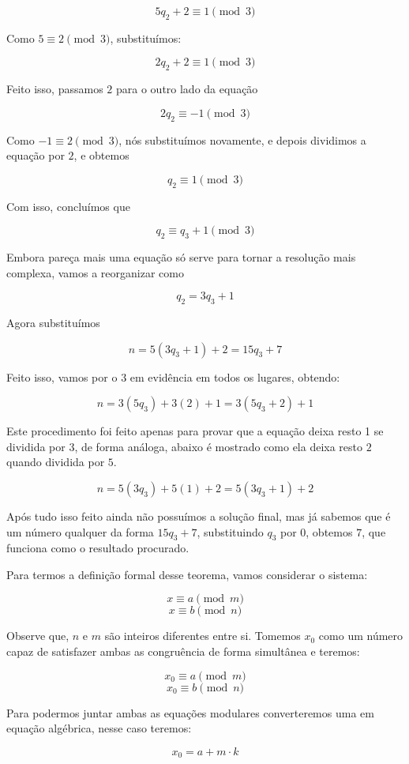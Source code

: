 $$5q_2 + 2 \equiv 1 \pmod{3}$$

Como $5 \equiv 2\pmod{3}$, substitu\'imos:

$$ 2q_2 + 2 \equiv 1 \pmod{3}$$

Feito isso, passamos $2$ para o outro lado da equa\c{c}\~ao

$$ 2q_2  \equiv -1 \pmod{3}$$

Como $-1 \equiv 2 \pmod{3}$, n\'os substitu\'imos novamente, e depois dividimos a equa\c{c}\~ao por $2$, e obtemos

$$ q_2  \equiv 1 \pmod{3}$$

Com isso, conclu\'imos que

$$ q_2  \equiv q_3 + 1 \pmod{3}$$

Embora pare\c{c}a mais uma equa\c{c}\~ao s\'o serve para tornar a resolu\c{c}\~ao mais complexa, vamos a reorganizar como

$$ q_2 = 3q_3 + 1 $$

Agora substitu\'imos

$$n = 5(3q_3 + 1) + 2 = 15q_3 +7$$

Feito isso, vamos por o $3$ em evid\^encia em todos os lugares, obtendo:

$$n = 3(5q_3) +3(2) +1 = 3(5q_3 +2)+1$$

Este procedimento foi feito apenas para provar que a equa\c{c}\~ao deixa resto 1 se dividida por 3, de forma an\'aloga, abaixo \'e mostrado como ela deixa resto $2$ quando dividida por $5$.

$$n = 5(3q_3) +5(1) +2 = 5(3q_3 +1)+2$$

Ap\'os tudo isso feito ainda n\~ao possu\'imos a solu\c{c}\~ao final, mas j\'a sabemos que \'e um n\'umero qualquer da forma $15q_3 + 7$, substituindo $q_3$ por $0$, obtemos $7$, que funciona como o resultado procurado.


Para termos a defini\c{c}\~ao formal desse teorema, vamos considerar o sistema:

$$x \equiv a \pmod{m}$$
$$x \equiv b \pmod{n}$$

Observe que, $n$ e $m$ s\~ao inteiros diferentes entre si. Tomemos $x_0$ como um n\'umero capaz de satisfazer ambas as congru\^encia de forma simult\^anea e teremos:

$$x_0 \equiv a \pmod{m}$$
$$x_0 \equiv b \pmod{n}$$

Para podermos juntar ambas as equa\c{c}\~oes modulares converteremos uma em equa\c{c}\~ao alg\'ebrica, nesse caso teremos: 

$$x_0 = a + m\cdot k$$

